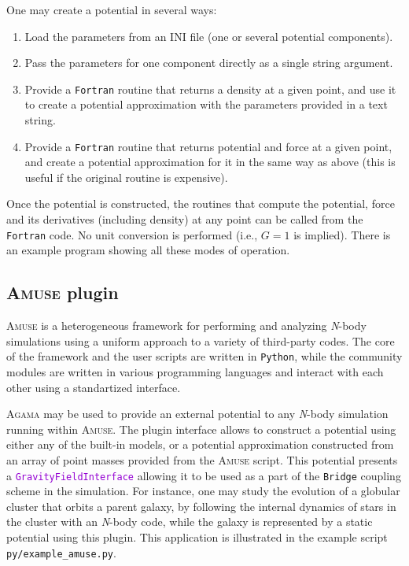\documentclass[12pt]{article}
\newcommand{\Agama}{\textsc{Agama}\xspace}
\newcommand{\Amuse}{\textsc{Amuse}\xspace}
\newcommand{\Nbody}{\textsl{N}-body\xspace}
\newcommand{\Python}{\texttt{Python}\xspace}
\newcommand{\Fortran}{\texttt{Fortran}\xspace}
\newcommand{\ttt}[1]{\textcolor{darkviolet}{\texttt{#1}}}
\begin{document}
One may create a potential in several ways:
\begin{enumerate}  \setlength{\parskip}{2pt} \setlength{\itemsep}{2pt}
\item Load the parameters from an INI file (one or several potential components).
\item Pass the parameters for one component directly as a single string argument.
\item Provide a \Fortran routine that returns a density at a given point, and use it to create a potential approximation with the parameters provided in a text string.
\item Provide a \Fortran routine that returns potential and force at a given point, and create a potential approximation for it in the same way as above (this is useful if the original routine is expensive).
\end{enumerate}
Once the potential is constructed, the routines that compute the potential, force and its derivatives (including density) at any point can be called from the \Fortran code. No unit conversion is performed (i.e., $G=1$ is implied).
There is an example program showing all these modes of operation.


\subsection{\Amuse plugin}  \label{sec:Amuse}

\Amuse \cite{PortegiesZwart2013} is a heterogeneous framework for performing and analyzing \Nbody simulations using a uniform approach to a variety of third-party codes. The core of the framework and the user scripts are written in \Python, while the community modules are written in various programming languages and interact with each other using a standartized interface.

\Agama may be used to provide an external potential to any \Nbody simulation running within \Amuse. The plugin interface allows to construct a potential using either any of the built-in models, or a potential approximation constructed from an array of point masses provided from the \Amuse script. This potential presents a \ttt{GravityFieldInterface} allowing it to be used as a part of the \texttt{Bridge} coupling scheme in the simulation. For instance, one may study the evolution of a globular cluster that orbits a parent galaxy, by following the internal dynamics of stars in the cluster with an \Nbody code, while the galaxy is represented by a static potential using this plugin. This application is illustrated in the example script \texttt{py/example_amuse.py}.
\end{document}
